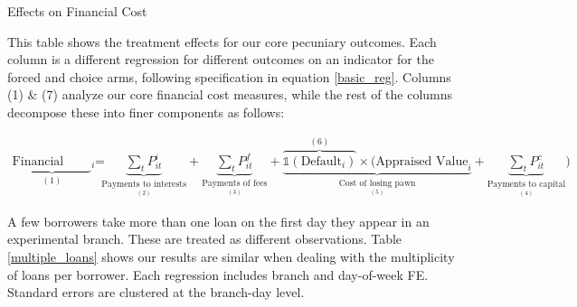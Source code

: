 \documentclass[oneside,11pt]{article}
\begin{document}
\begin{table}[H]
\caption{Effects on Financial Cost}
\label{main_impact_table}
\begin{center}
\scriptsize{}
\end{center}
\scriptsize This table shows the treatment effects for our core pecuniary outcomes. Each column is a different regression for different outcomes on an indicator for the forced and choice arms, following specification in equation \ref{basic_reg}. Columns (1) \& (7) analyze our core financial cost measures, while the rest of the columns decompose these into finer components as follows:

\begin{align*}
    \underbrace{\text{Financial Cost}_i}_{(1)} =&  \underbrace{\sum_t P^i_{it}}_{\underset{(2)}{\text{Payments to interests}}}  +\underbrace{\sum_t P^f_{it}}_{\underset{(3)}{\text{Payments of fees}}} + \underbrace{\overbrace{\mathds{1}(\text{Default}_i)}^{(6)}\times (\text{Appraised Value}_i}_{\underset{(5)}{\text{Cost of losing pawn}}} + \underbrace{\sum_t P^c_{it}}_{\underset{(4)}{\text{Payments to capital}}})
\end{align*}

A few borrowers take more than one loan on the first day they appear in an experimental branch.  These are treated as different observations. Table \ref{multiple_loans} shows our results are similar when dealing with the multiplicity of loans per borrower. Each regression includes branch and day-of-week FE. Standard errors are clustered at the branch-day level. 

\end{table}
\end{document}
